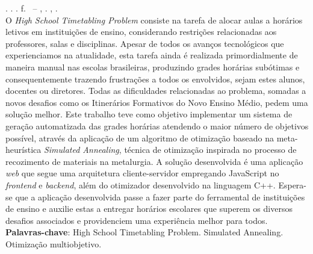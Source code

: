 
\begin{resumo}[RESUMO]
\begin{SingleSpacing}

\imprimirautorcitacao. \imprimirtitulo. \imprimirdata. \pageref {LastPage} f. \imprimirprojeto\ – \imprimirprograma, \imprimirinstituicao. \imprimirlocal, \imprimirdata.\\

O \textit{High School Timetabling Problem} consiste na tarefa de alocar aulas a horários letivos em instituições de ensino, considerando restrições relacionadas aos professores, salas e disciplinas. Apesar de todos os avanços tecnológicos que experienciamos na atualidade, esta tarefa ainda é realizada primordialmente de maneira manual nas escolas brasileiras, produzindo grades horárias subótimas e consequentemente trazendo frustrações a todos os envolvidos, sejam estes alunos, docentes ou diretores. Todas as dificuldades relacionadas ao problema, somadas a novos desafios como os Itinerários Formativos do Novo Ensino Médio, pedem uma solução melhor. Este trabalho teve como objetivo implementar um sistema de geração automatizada das grades horárias atendendo o maior número de objetivos possível, através da aplicação de um algoritmo de otimização baseado na meta-heurística \textit{Simulated Annealing}, técnica de otimização inspirada no processo de recozimento de materiais na metalurgia. A solução desenvolvida é uma aplicação \textit{web} que segue uma arquitetura cliente-servidor empregando JavaScript no \textit{frontend} e \textit{backend}, além do otimizador desenvolvido na linguagem C++. Espera-se que a aplicação desenvolvida passe a fazer parte do ferramental de instituições de ensino e auxilie estas a entregar horários escolares que superem os diversos desafios associados e providenciem uma experiência melhor para todos.
\\

\textbf{Palavras-chave}: High School Timetabling Problem. Simulated Annealing. Otimização multiobjetivo.

\end{SingleSpacing}
\end{resumo}

